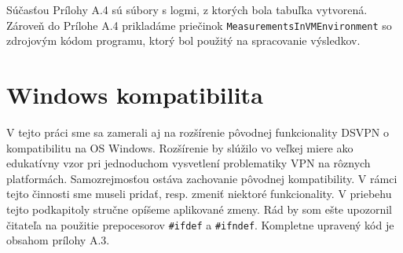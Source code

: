 \begin{table}[h!]
	\centering
	\caption{Výsledky z experimentálnych meraní funkcií na šifrovanie a dešifrovanie v prostredí virtuálnych strojov}
	\label{tabmer}
\end{table}

Súčasťou Prílohy A.4 sú súbory s logmi, z ktorých bola tabuľka vytvorená. Zároveň do Prílohe A.4 prikladáme priečinok \lstinline|MeasurementsInVMEnvironment| so zdrojovým kódom programu, ktorý bol použitý na spracovanie výsledkov.  
\section{Windows kompatibilita}
V tejto práci sme sa zamerali aj na rozšírenie pôvodnej funkcionality DSVPN o kompatibilitu na OS Windows. Rozšírenie by slúžilo vo veľkej miere ako edukatívny vzor pri jednoduchom vysvetlení problematiky VPN na rôznych platformách. Samozrejmosťou ostáva zachovanie pôvodnej kompatibility. V rámci tejto činnosti sme museli pridať, resp. zmeniť niektoré funkcionality. V priebehu tejto podkapitoly stručne opíšeme aplikované zmeny. Rád by som ešte upozornil čitateľa na použitie prepocesorov \lstinline|#ifdef| a \lstinline|#ifndef|. Kompletne upravený kód je obsahom prílohy A.3.

